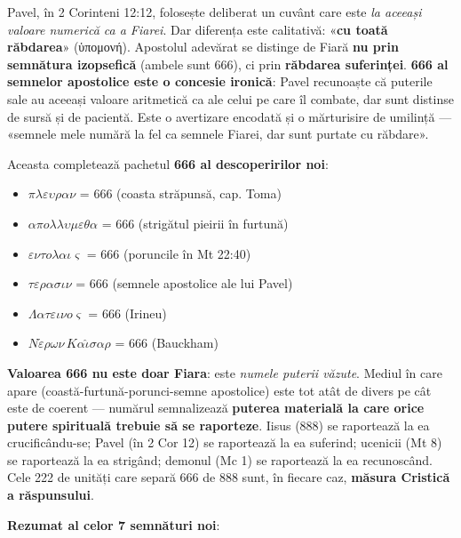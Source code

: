 \documentclass[12pt,a4paper,twoside,openany]{book}
\begin{document}
Pavel, în 2 Corinteni 12:12, folosește deliberat un cuvânt care este \textit{la aceeași valoare numerică ca a Fiarei}. Dar diferența este calitativă: «\textbf{cu toată răbdarea}» (ὑπομονή). Apostolul adevărat se distinge de Fiară \textbf{nu prin semnătura izopsefică} (ambele sunt 666), ci prin \textbf{răbdarea suferinței}. \textbf{666 al semnelor apostolice este o concesie ironică}: Pavel recunoaște că puterile sale au aceeași valoare aritmetică ca ale celui pe care îl combate, dar sunt distinse de sursă și de pacientă. Este o avertizare encodată și o mărturisire de umilință — «semnele mele numără la fel ca semnele Fiarei, dar sunt purtate cu răbdare».

Aceasta completează pachetul \textbf{666 al descoperirilor noi}:
\begin{itemize}
  \item $\pi\lambda\varepsilon\upsilon\rho\alpha\nu$ = 666 (coasta străpunsă, cap. Toma)
  \item $\alpha\pi o\lambda\lambda\upsilon\mu\varepsilon\theta\alpha$ = 666 (strigătul pieirii în furtună)
  \item $\varepsilon\nu\tau o\lambda\alpha\iota\varsigma$ = 666 (poruncile în Mt 22:40)
  \item $\tau\varepsilon\rho\alpha\sigma\iota\nu$ = 666 (semnele apostolice ale lui Pavel)
  \item $\Lambda\alpha\tau\varepsilon\iota\nu o\varsigma$ = 666 (Irineu)
  \item $N\acute{\varepsilon}\rho\omega\nu\,K\alpha\hat{\iota}\sigma\alpha\rho$ = 666 (Bauckham)
\end{itemize}

\textbf{Valoarea 666 nu este doar Fiara}: este \textit{numele puterii văzute}. Mediul în care apare (coastă-furtună-porunci-semne apostolice) este tot atât de divers pe cât este de coerent — numărul semnalizează \textbf{puterea materială la care orice putere spirituală trebuie să se raporteze}. Iisus (888) se raportează la ea crucificându-se; Pavel (în 2 Cor 12) se raportează la ea suferind; ucenicii (Mt 8) se raportează la ea strigând; demonul (Mc 1) se raportează la ea recunoscând. Cele 222 de unități care separă 666 de 888 sunt, în fiecare caz, \textbf{măsura Cristică a răspunsului}.

\bigskip

\textbf{Rezumat al celor 7 semnături noi}:
\end{document}
